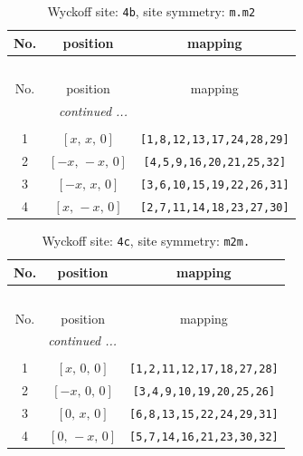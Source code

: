 \documentclass[fleqn,8pt]{jsarticle}
\begin{document}
\renewcommand{\arraystretch}{1.2}
\begin{longtable}{ccc}
\caption{Wyckoff site: {\tt 4b}, site symmetry: {\tt m.m2}}
 \\
 \hline \hline
No. & position & mapping \\ \hline \endfirsthead

\multicolumn{2}{l}{\tablename\ \thetable{}} \\
 \hline \hline
No. & position & mapping \\ \hline \endhead

 \hline \hline
\multicolumn{2}{r}{\footnotesize\it continued ...} \\ \endfoot

 \hline \hline
\multicolumn{2}{r}{} \\ \endlastfoot

1 & $\left[ x,\, x,\, 0 \right]$ & {\tt [1,8,12,13,17,24,28,29]} \\ \hline
2 & $\left[ - x,\, - x,\, 0 \right]$ & {\tt [4,5,9,16,20,21,25,32]} \\ \hline
3 & $\left[ - x,\, x,\, 0 \right]$ & {\tt [3,6,10,15,19,22,26,31]} \\ \hline
4 & $\left[ x,\, - x,\, 0 \right]$ & {\tt [2,7,11,14,18,23,27,30]} \\
\end{longtable}
\renewcommand{\arraystretch}{1.2}
\begin{longtable}{ccc}
\caption{Wyckoff site: {\tt 4c}, site symmetry: {\tt m2m.}}
 \\
 \hline \hline
No. & position & mapping \\ \hline \endfirsthead

\multicolumn{2}{l}{\tablename\ \thetable{}} \\
 \hline \hline
No. & position & mapping \\ \hline \endhead

 \hline \hline
\multicolumn{2}{r}{\footnotesize\it continued ...} \\ \endfoot

 \hline \hline
\multicolumn{2}{r}{} \\ \endlastfoot

1 & $\left[ x,\, 0,\, 0 \right]$ & {\tt [1,2,11,12,17,18,27,28]} \\ \hline
2 & $\left[ - x,\, 0,\, 0 \right]$ & {\tt [3,4,9,10,19,20,25,26]} \\ \hline
3 & $\left[ 0,\, x,\, 0 \right]$ & {\tt [6,8,13,15,22,24,29,31]} \\ \hline
4 & $\left[ 0,\, - x,\, 0 \right]$ & {\tt [5,7,14,16,21,23,30,32]} \\
\end{longtable}
\end{document}
